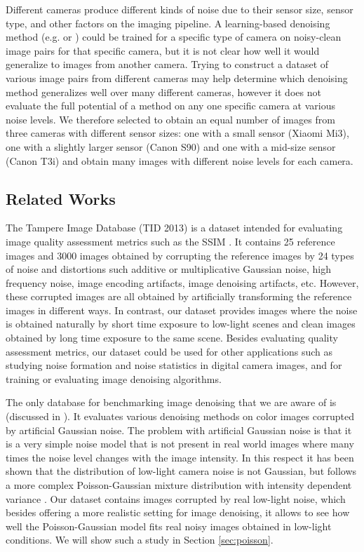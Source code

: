 \documentclass[review]{elsarticle}
\begin{document}
Different cameras produce different kinds of noise due to their sensor size, sensor type, and other factors on the imaging pipeline. A learning-based denoising method (e.g. \cite{barbu2009training, NeuralNetworkCompete} or \cite{optMRF}) could be trained for a specific type of camera on noisy-clean image pairs for that specific camera, but it is not clear how well it would generalize to images from another camera. Trying to construct a dataset of various image pairs from  different cameras may help determine which denoising method generalizes well over many different cameras, however it does not evaluate the full potential of a method on any one specific camera at various noise levels. We therefore selected to obtain an equal number of images from three cameras with different sensor sizes: one with a small sensor (Xiaomi Mi3), one with a slightly larger sensor  (Canon S90) and one with a mid-size sensor (Canon T3i) and obtain many images with different noise levels for each camera. 


\subsection{Related Works}
The Tampere Image Database (TID 2013) \cite{ponomarenko2015image} is a dataset intended for evaluating image quality assessment metrics such as the SSIM \cite{ssim}. It contains 25 reference images and 3000 images obtained by corrupting the reference images by 24 types of noise and distortions such additive or multiplicative Gaussian noise, high frequency noise, image encoding artifacts, image denoising artifacts, etc. However, these corrupted images are all obtained by artificially transforming the reference images in different ways. In contrast, our dataset provides images where the noise is obtained naturally by short time exposure to low-light scenes and clean images obtained by long time exposure to the same scene. Besides evaluating quality assessment metrics, our dataset could be used for other applications such as studying noise formation and noise statistics in digital camera images, and for training or evaluating image denoising algorithms.
 
The only database for benchmarking image denoising that we are aware of  is \cite{ImageDenoisingBenchmark} (discussed in \cite{StochasticImageDenoising}). It evaluates various denoising methods on color images corrupted by artificial Gaussian noise. The problem with artificial Gaussian noise is  that it is a very simple noise model that is not present in real world images where many times the noise level changes with the image intensity. In this respect it has been shown that the distribution of low-light camera noise is not Gaussian, but follows a more complex Poisson-Gaussian mixture distribution with intensity dependent variance \cite{Foi-Poisson,Luisier2010d}. Our dataset contains images corrupted by real low-light noise, which besides offering a more realistic setting for image denoising, it allows to see how well the Poisson-Gaussian model fits real noisy images obtained in low-light conditions. We will show such a study in Section \ref{sec:poisson}.
 
\end{document}
